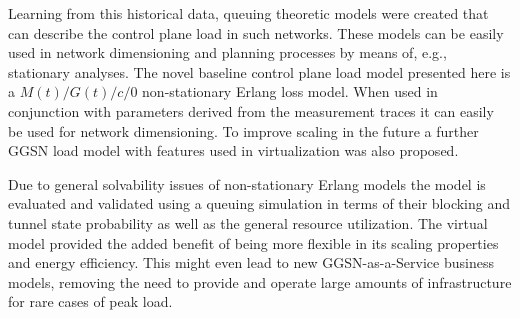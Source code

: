 Learning from this historical data, queuing theoretic models were created that can describe the control plane load in such networks. These models can be easily used in network dimensioning and planning processes by means of, e.g., stationary analyses. The novel baseline control plane load model presented here is a $M(t)/G(t)/c/0$ non-stationary Erlang loss model. When used in conjunction with parameters derived from the measurement traces it can easily be used for network dimensioning. To improve scaling in the future a further \gls{GGSN} load model with features used in virtualization was also proposed.

Due to general solvability issues of non-stationary Erlang models the model is evaluated and validated using a queuing simulation in terms of their blocking and tunnel state probability as well as the general resource utilization. The virtual model provided the added benefit of being more flexible in its scaling properties and energy efficiency. This might even lead to new \gls{GGSN}-as-a-Service business models, removing the need to provide and operate large amounts of infrastructure for rare cases of peak load. 




